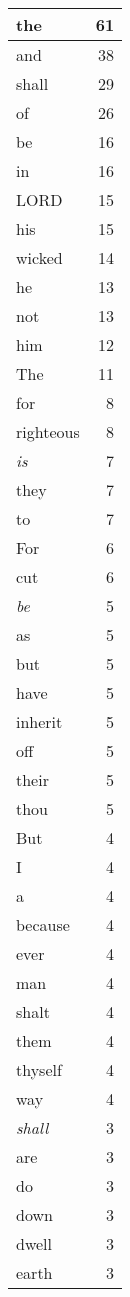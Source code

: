 \begin{center}
\begin{longtable}{l|r}
\hline \hline
\endlastfoot
the & 61 \\ \hline
and & 38 \\ \hline
shall & 29 \\ \hline
of & 26 \\ \hline
be & 16 \\ \hline
in & 16 \\ \hline
LORD & 15 \\ \hline
his & 15 \\ \hline
wicked & 14 \\ \hline
he & 13 \\ \hline
not & 13 \\ \hline
him & 12 \\ \hline
The & 11 \\ \hline
for & 8 \\ \hline
righteous & 8 \\ \hline
\emph{is} & 7 \\ \hline
they & 7 \\ \hline
to & 7 \\ \hline
For & 6 \\ \hline
cut & 6 \\ \hline
\emph{be} & 5 \\ \hline
as & 5 \\ \hline
but & 5 \\ \hline
have & 5 \\ \hline
inherit & 5 \\ \hline
off & 5 \\ \hline
their & 5 \\ \hline
thou & 5 \\ \hline
But & 4 \\ \hline
I & 4 \\ \hline
a & 4 \\ \hline
because & 4 \\ \hline
ever & 4 \\ \hline
man & 4 \\ \hline
shalt & 4 \\ \hline
them & 4 \\ \hline
thyself & 4 \\ \hline
way & 4 \\ \hline
\emph{shall} & 3 \\ \hline
are & 3 \\ \hline
do & 3 \\ \hline
down & 3 \\ \hline
dwell & 3 \\ \hline
earth & 3 \\ \hline

\end{longtable}
\end{center}
